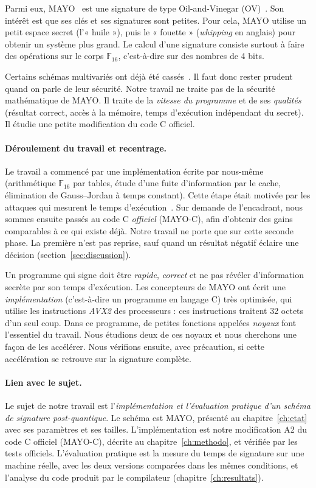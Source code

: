 Parmi eux, MAYO~\cite{mayo} est une signature de type Oil-and-Vinegar (OV)~\cite{patarin,kipnisshamir,uov}. Son intérêt est que ses clés et ses signatures sont petites. Pour cela, MAYO utilise un petit espace secret (l'« huile »), puis le « fouette » (\emph{whipping} en anglais) pour obtenir un système plus grand. Le calcul d'une signature consiste surtout à faire des opérations sur le corps $\mathbb{F}_{16}$, c'est-à-dire sur des nombres de 4 bits.

Certains schémas multivariés ont déjà été cassés~\cite{beullensrainbow}. Il faut donc rester prudent quand on parle de leur sécurité. Notre travail ne traite pas de la sécurité mathématique de MAYO. Il traite de la \emph{vitesse du programme} et de ses \emph{qualités} (résultat correct, accès à la mémoire, temps d'exécution indépendant du secret). Il étudie une petite modification du code C officiel.

\paragraph{Déroulement du travail et recentrage.} Le travail a commencé par une implémentation écrite par nous-même (arithmétique $\mathbb{F}_{16}$ par tables, étude d'une fuite d'information par le cache, élimination de Gauss--Jordan à temps constant). Cette étape était motivée par les attaques qui mesurent le temps d'exécution~\cite{kocher,bernstein}. Sur demande de l'encadrant, nous sommes ensuite passés au code C \emph{officiel} (MAYO-C), afin d'obtenir des gains comparables à ce qui existe déjà. Notre travail ne porte que sur cette seconde phase. La première n'est pas reprise, sauf quand un résultat négatif éclaire une décision (section~\ref{sec:discussion}).

Un programme qui signe doit être \emph{rapide}, \emph{correct} et ne pas révéler d'information secrète par son temps d'exécution. Les concepteurs de MAYO ont écrit une \emph{implémentation} (c'est-à-dire un programme en langage C) très optimisée, qui utilise les instructions \emph{AVX2} des processeurs : ces instructions traitent 32 octets d'un seul coup. Dans ce programme, de petites fonctions appelées \emph{noyaux} font l'essentiel du travail. Nous étudions deux de ces noyaux et nous cherchons une façon de les accélérer. Nous vérifions ensuite, avec précaution, si cette accélération se retrouve sur la signature complète.

\paragraph{Lien avec le sujet.} Le sujet de notre travail est l'\emph{implémentation et l'évaluation pratique d'un schéma de signature post-quantique}. Le schéma est MAYO, présenté au chapitre~\ref{ch:etat} avec ses paramètres et ses tailles. L'implémentation est notre modification A2 du code C officiel (MAYO-C), décrite au chapitre~\ref{ch:methodo}, et vérifiée par les tests officiels. L'évaluation pratique est la mesure du temps de signature sur une machine réelle, avec les deux versions comparées dans les mêmes conditions, et l'analyse du code produit par le compilateur (chapitre~\ref{ch:resultats}).

